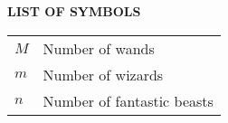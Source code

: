 
\begin{center}
\textbf{LIST OF SYMBOLS}
\vspace{16pt}
\end{center}

\noindent
\begin{tabular}{@{}p{0.8in} l}
$M$ & Number of wands\\
$m$ & Number of wizards\\
$n$ & Number of fantastic beasts\\
\end{tabular}

\clearpage
